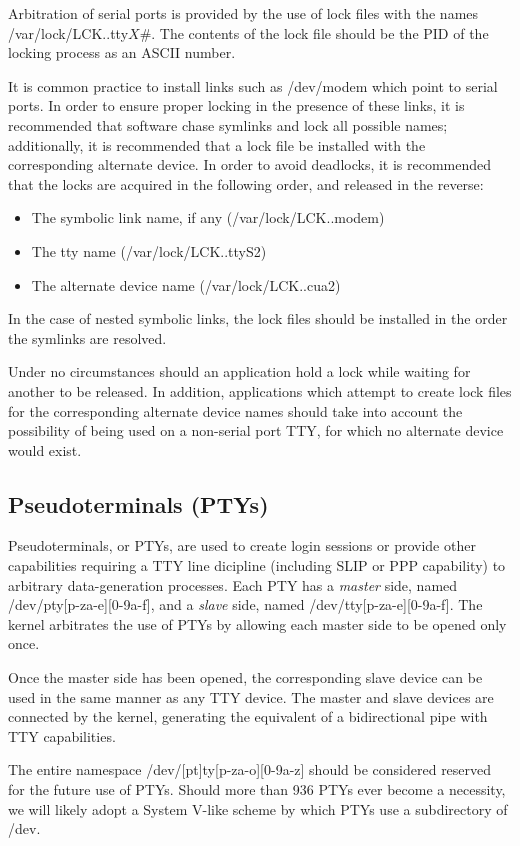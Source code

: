 Arbitration of serial ports is provided by the use of lock files with
the names {\file /var/lock/LCK..tty${X\#}$}.  The contents of the lock
file should be the PID of the locking process as an ASCII number.

It is common practice to install links such as {\file /dev/modem\/}
which point to serial ports.  In order to ensure proper locking in the
presence of these links, it is recommended that software chase
symlinks and lock all possible names; additionally, it is recommended
that a lock file be installed with the corresponding alternate
device.  In order to avoid deadlocks, it is recommended that the locks
are acquired in the following order, and released in the reverse:
\begin{itemize}
\item{The symbolic link name, if any ({\file /var/lock/LCK..modem})}
\item{The {\file tty} name ({\file /var/lock/LCK..ttyS2})}
\item{The alternate device name ({\file /var/lock/LCK..cua2})}
\end{itemize}
In the case of nested symbolic links, the lock files should be
installed in the order the symlinks are resolved.

Under no circumstances should an application hold a lock while waiting
for another to be released.  In addition, applications which attempt
to create lock files for the corresponding alternate device names
should take into account the possibility of being used on a non-serial
port TTY, for which no alternate device would exist.

\subsection{Pseudoterminals (PTYs)}

Pseudoterminals, or PTYs, are used to create login sessions or provide
other capabilities requiring a TTY line dicipline (including SLIP or
PPP capability) to arbitrary data-generation processes.  Each PTY has
a {\em master\/} side, named {\file /dev/pty[p-za-e][0-9a-f]\/}, and a
{\em slave\/} side, named {\file /dev/tty[p-za-e][0-9a-f]\/}.  The
kernel arbitrates the use of PTYs by allowing each master side to be
opened only once.

Once the master side has been opened, the corresponding slave device
can be used in the same manner as any TTY device.  The master and
slave devices are connected by the kernel, generating the equivalent
of a bidirectional pipe with TTY capabilities.

The entire namespace {\file /dev/[pt]ty[p-za-o][0-9a-z]\/} should be
considered reserved for the future use of PTYs.  Should more than 936
PTYs ever become a necessity, we will likely adopt a System V-like
scheme by which PTYs use a subdirectory of {\file /dev}.


